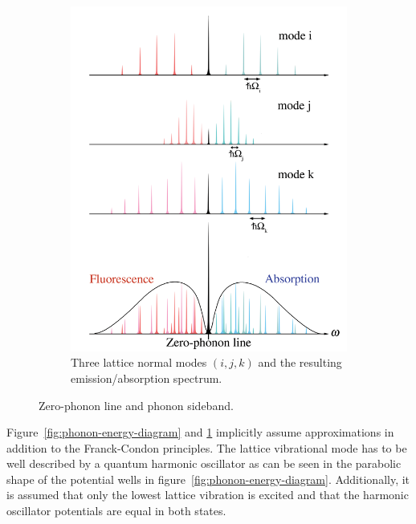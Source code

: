 \begin{figure}[H]
\begin{subfigure}[b]{0.48\textwidth}
		\includegraphics[width=\textwidth]{figures/quantum-dot/Lattice-modes}
		\caption{Three lattice normal modes $(i, j, k)$ and the resulting emission/absorption spectrum.~\cite{noauthor_zero-phonon_nodate}\\}
		\label{fig:lattice-modes}
	\end{subfigure}
	\caption{Zero-phonon line and phonon sideband.}
	\label{fig:zero-phonon-line-phonon-side-band}
\end{figure}
Figure~\ref{fig:phonon-energy-diagram} and \ref{fig:lattice-modes} implicitly assume approximations in addition to the Franck-Condon principles.
The lattice vibrational mode has to be well described by a quantum harmonic oscillator as can be seen in the parabolic shape of the potential wells in figure~\ref{fig:phonon-energy-diagram}.
Additionally, it is assumed that only the lowest lattice vibration is excited and that the harmonic oscillator potentials are equal in both states.

